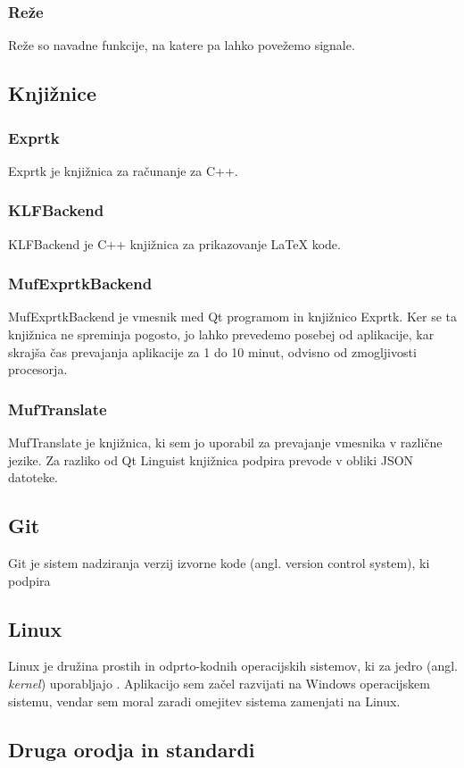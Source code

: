 \documentclass[12pt,titlepage]{report}
\begin{document}
			\subsubsection{Reže\cite{qt_slots}}
				Reže so navadne funkcije, na katere pa lahko povežemo signale.
		\subsection{Knjižnice}
			\subsubsection{Exprtk\cite{exprtk,exprtk_git}}
				Exprtk je knjižnica za računanje za C++.
			\subsubsection{KLFBackend\cite{qt_klf}}
				KLFBackend je C++ knjižnica za prikazovanje \LaTeX{} kode.
			\subsubsection{MufExprtkBackend}
				MufExprtkBackend je vmesnik med Qt programom in knjižnico Exprtk.
				Ker se ta knjižnica ne spreminja pogosto, jo lahko prevedemo posebej od aplikacije, kar skrajša čas prevajanja aplikacije za 1 do 10 minut, odvisno od zmogljivosti procesorja.
			\subsubsection{MufTranslate}
				MufTranslate je knjižnica, ki sem jo uporabil za prevajanje vmesnika v različne jezike.
				Za razliko od Qt Linguist knjižnica podpira prevode v obliki JSON datoteke.
		\subsection{Git}
			Git je sistem nadziranja verzij izvorne kode (angl. version control system), ki podpira
		\subsection{Linux}
			Linux je družina prostih in odprto-kodnih operacijskih sistemov, ki za jedro (angl. \emph{kernel}) uporabljajo .
			Aplikacijo sem začel razvijati na Windows operacijskem sistemu, vendar sem moral zaradi omejitev sistema zamenjati na Linux. %
			
		\subsection{Druga orodja in standardi}
\end{document}
